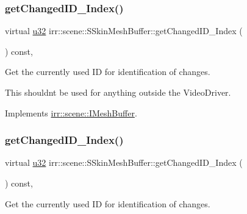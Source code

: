\subsubsection{\texorpdfstring{get\+Changed\+I\+D\+\_\+\+Index()}{getChangedID\_Index()}\hspace{0.1cm}{\footnotesize\ttfamily [1/2]}}
{\footnotesize\ttfamily virtual \hyperlink{namespaceirr_a0416a53257075833e7002efd0a18e804}{u32} irr\+::scene\+::\+S\+Skin\+Mesh\+Buffer\+::get\+Changed\+I\+D\+\_\+\+Index (\begin{DoxyParamCaption}{ }\end{DoxyParamCaption}) const\hspace{0.3cm}{\ttfamily [inline]}, {\ttfamily [virtual]}}



Get the currently used ID for identification of changes. 

This shouldn\textquotesingle{}t be used for anything outside the Video\+Driver. 

Implements \hyperlink{classirr_1_1scene_1_1IMeshBuffer_acc389d76856dfb06c3ba45a92315e6d8}{irr\+::scene\+::\+I\+Mesh\+Buffer}.

\mbox{\label{structirr_1_1scene_1_1SSkinMeshBuffer_a60b444cfe4b0cec6d2cc4bdf7958dd16}} 
\subsubsection{\texorpdfstring{get\+Changed\+I\+D\+\_\+\+Index()}{getChangedID\_Index()}\hspace{0.1cm}{\footnotesize\ttfamily [2/2]}}
{\footnotesize\ttfamily virtual \hyperlink{namespaceirr_a0416a53257075833e7002efd0a18e804}{u32} irr\+::scene\+::\+S\+Skin\+Mesh\+Buffer\+::get\+Changed\+I\+D\+\_\+\+Index (\begin{DoxyParamCaption}{ }\end{DoxyParamCaption}) const\hspace{0.3cm}{\ttfamily [inline]}, {\ttfamily [virtual]}}



Get the currently used ID for identification of changes. 

